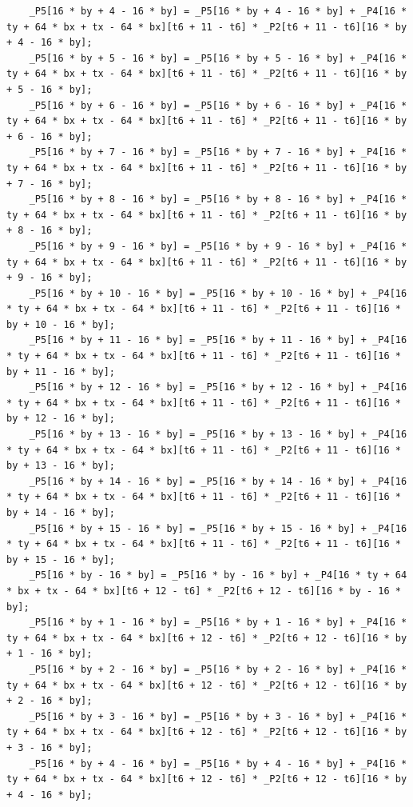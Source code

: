 \documentclass[msthesis,justified,copyright,final,numbers,sort&compress,
gsmodern,amstex,natbib]{uothesis}
\begin{document}
\begin{lstlisting}
    _P5[16 * by + 4 - 16 * by] = _P5[16 * by + 4 - 16 * by] + _P4[16 * ty + 64 * bx + tx - 64 * bx][t6 + 11 - t6] * _P2[t6 + 11 - t6][16 * by + 4 - 16 * by];
    _P5[16 * by + 5 - 16 * by] = _P5[16 * by + 5 - 16 * by] + _P4[16 * ty + 64 * bx + tx - 64 * bx][t6 + 11 - t6] * _P2[t6 + 11 - t6][16 * by + 5 - 16 * by];
    _P5[16 * by + 6 - 16 * by] = _P5[16 * by + 6 - 16 * by] + _P4[16 * ty + 64 * bx + tx - 64 * bx][t6 + 11 - t6] * _P2[t6 + 11 - t6][16 * by + 6 - 16 * by];
    _P5[16 * by + 7 - 16 * by] = _P5[16 * by + 7 - 16 * by] + _P4[16 * ty + 64 * bx + tx - 64 * bx][t6 + 11 - t6] * _P2[t6 + 11 - t6][16 * by + 7 - 16 * by];
    _P5[16 * by + 8 - 16 * by] = _P5[16 * by + 8 - 16 * by] + _P4[16 * ty + 64 * bx + tx - 64 * bx][t6 + 11 - t6] * _P2[t6 + 11 - t6][16 * by + 8 - 16 * by];
    _P5[16 * by + 9 - 16 * by] = _P5[16 * by + 9 - 16 * by] + _P4[16 * ty + 64 * bx + tx - 64 * bx][t6 + 11 - t6] * _P2[t6 + 11 - t6][16 * by + 9 - 16 * by];
    _P5[16 * by + 10 - 16 * by] = _P5[16 * by + 10 - 16 * by] + _P4[16 * ty + 64 * bx + tx - 64 * bx][t6 + 11 - t6] * _P2[t6 + 11 - t6][16 * by + 10 - 16 * by];
    _P5[16 * by + 11 - 16 * by] = _P5[16 * by + 11 - 16 * by] + _P4[16 * ty + 64 * bx + tx - 64 * bx][t6 + 11 - t6] * _P2[t6 + 11 - t6][16 * by + 11 - 16 * by];
    _P5[16 * by + 12 - 16 * by] = _P5[16 * by + 12 - 16 * by] + _P4[16 * ty + 64 * bx + tx - 64 * bx][t6 + 11 - t6] * _P2[t6 + 11 - t6][16 * by + 12 - 16 * by];
    _P5[16 * by + 13 - 16 * by] = _P5[16 * by + 13 - 16 * by] + _P4[16 * ty + 64 * bx + tx - 64 * bx][t6 + 11 - t6] * _P2[t6 + 11 - t6][16 * by + 13 - 16 * by];
    _P5[16 * by + 14 - 16 * by] = _P5[16 * by + 14 - 16 * by] + _P4[16 * ty + 64 * bx + tx - 64 * bx][t6 + 11 - t6] * _P2[t6 + 11 - t6][16 * by + 14 - 16 * by];
    _P5[16 * by + 15 - 16 * by] = _P5[16 * by + 15 - 16 * by] + _P4[16 * ty + 64 * bx + tx - 64 * bx][t6 + 11 - t6] * _P2[t6 + 11 - t6][16 * by + 15 - 16 * by];
    _P5[16 * by - 16 * by] = _P5[16 * by - 16 * by] + _P4[16 * ty + 64 * bx + tx - 64 * bx][t6 + 12 - t6] * _P2[t6 + 12 - t6][16 * by - 16 * by];
    _P5[16 * by + 1 - 16 * by] = _P5[16 * by + 1 - 16 * by] + _P4[16 * ty + 64 * bx + tx - 64 * bx][t6 + 12 - t6] * _P2[t6 + 12 - t6][16 * by + 1 - 16 * by];
    _P5[16 * by + 2 - 16 * by] = _P5[16 * by + 2 - 16 * by] + _P4[16 * ty + 64 * bx + tx - 64 * bx][t6 + 12 - t6] * _P2[t6 + 12 - t6][16 * by + 2 - 16 * by];
    _P5[16 * by + 3 - 16 * by] = _P5[16 * by + 3 - 16 * by] + _P4[16 * ty + 64 * bx + tx - 64 * bx][t6 + 12 - t6] * _P2[t6 + 12 - t6][16 * by + 3 - 16 * by];
    _P5[16 * by + 4 - 16 * by] = _P5[16 * by + 4 - 16 * by] + _P4[16 * ty + 64 * bx + tx - 64 * bx][t6 + 12 - t6] * _P2[t6 + 12 - t6][16 * by + 4 - 16 * by];

\end{lstlisting}
\end{document}
